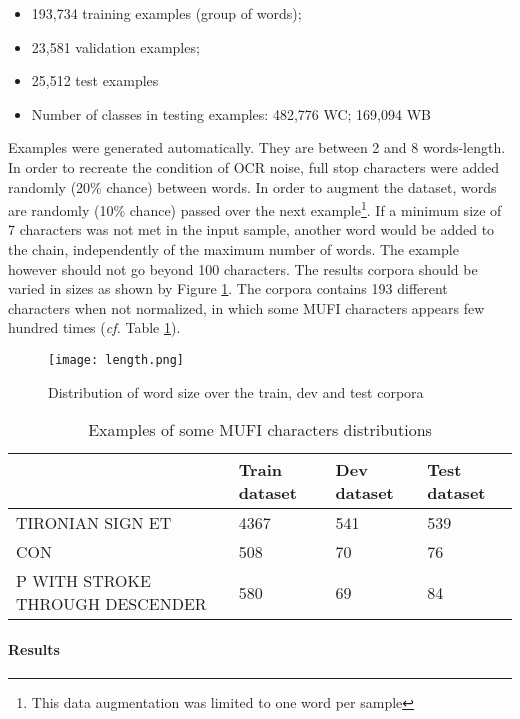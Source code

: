 \documentclass{jdmdh}
\begin{document}
\begin{itemize}
    \item 193,734 training examples (group of words);
    \item 23,581 validation examples;
    \item 25,512 test examples
    \item Number of classes in testing examples: 482,776 WC; 169,094 WB
\end{itemize}

Examples were generated automatically. They are between 2 and 8 words-length. In order to recreate the condition of OCR noise, full stop characters were added randomly (20\% chance) between words. In order to augment the dataset, words are randomly (10\% chance) passed over the next example\footnote{This data augmentation was limited to one word per sample}. If a minimum size of 7 characters was not met in the input sample, another word would be added to the chain, independently of the maximum number of words. The example however should not go beyond 100 characters. The results corpora should be varied in sizes as shown by Figure \ref{fig:word_sizes}. The corpora contains 193 different characters when not normalized, in which some MUFI characters appears few hundred times (\textit{cf.} Table \ref{tab:mufi_examples}).

\begin{figure}[!ht]
  \centering
  \texttt{[image: length.png]}
  \caption{Distribution of word size over the train, dev and test corpora}
  \label{fig:word_sizes}
\end{figure}

\begin{table}[!ht]
\begin{tabular}{llll}
\hline
                                                   & Train dataset & Dev dataset & Test dataset \\ \hline
TIRONIAN SIGN ET                                   & 4367          & 541         & 539          \\
CON                             & 508           & 70          & 76           \\
P WITH STROKE THROUGH DESCENDER & 580           & 69          & 84           \\ \hline
\end{tabular}
  \caption{Examples of some MUFI characters distributions}
  \label{tab:mufi_examples}
\end{table}

\paragraph{Results}
\end{document}
